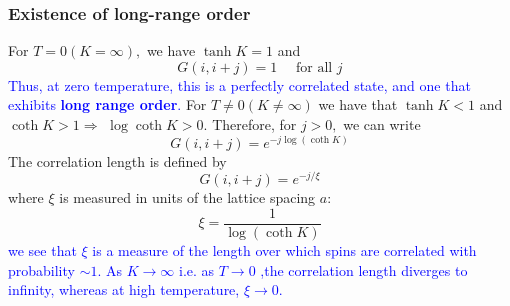 \documentclass[12pt,titlepage]{article}
\numberwithin{equation}{section}
\begin{document}
\subsubsection{Existence of long-range order}
For $T=0(K=\infty),$ we have $\tanh K=1$ and
\begin{equation}
G(i, i+j)=1 \quad \text { for all } j
\end{equation}
\textcolor{blue}{Thus, at zero temperature, this is a perfectly correlated state, and one that exhibits \textbf{long range order}.}
For $T \neq 0(K \neq \infty)$ we have that $\tanh K<1$ and $\operatorname{coth} K>1 \Rightarrow$
$\log \operatorname{coth} K>0 .$ Therefore, for $j>0,$ we can write
\begin{equation}
G(i, i+j)=e^{-j \log (\operatorname{coth} K)}
\end{equation}
The correlation length is defined by
\begin{equation}
G(i, i+j)=e^{-j / \xi}
\end{equation}
where $\xi$ is measured in units of the lattice spacing $a$:
\begin{equation}
\xi=\frac{1}{\log (\operatorname{coth} K)}
\end{equation}
\textcolor{blue}{we see that $\xi$ is a measure of the length over which spins are correlated with probability $\sim 1 .$ As $K \rightarrow \infty$ i.e. as $T \rightarrow 0$ ,the correlation length diverges to infinity, whereas at high temperature, $\xi \rightarrow 0$.}
\end{document}
